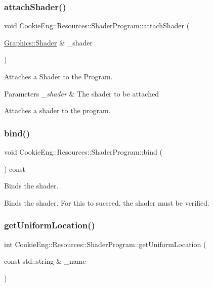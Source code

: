 \subsubsection{\texorpdfstring{attach\+Shader()}{attachShader()}}
{\footnotesize\ttfamily void Cookie\+Eng\+::\+Resources\+::\+Shader\+Program\+::attach\+Shader (\begin{DoxyParamCaption}\item[{\hyperlink{class_cookie_eng_1_1_graphics_1_1_shader}{Graphics\+::\+Shader} \&}]{\+\_\+shader }\end{DoxyParamCaption})}



Attaches a Shader to the Program. 


\begin{DoxyParams}{Parameters}
{\em \+\_\+shader} & The shader to be attached\\
\hline
\end{DoxyParams}
Attaches a shader to the program. \mbox{\label{class_cookie_eng_1_1_resources_1_1_shader_program_a4824333f2e0ee0e7cfc91cb0de92e065}} 
\subsubsection{\texorpdfstring{bind()}{bind()}}
{\footnotesize\ttfamily void Cookie\+Eng\+::\+Resources\+::\+Shader\+Program\+::bind (\begin{DoxyParamCaption}{ }\end{DoxyParamCaption}) const}



Binds the shader. 

Binds the shader. For this to sucseed, the shader must be verified. \mbox{\label{class_cookie_eng_1_1_resources_1_1_shader_program_ae2fb823b3e8da3cf7154e0a8ffe25c85}} 
\subsubsection{\texorpdfstring{get\+Uniform\+Location()}{getUniformLocation()}}
{\footnotesize\ttfamily int Cookie\+Eng\+::\+Resources\+::\+Shader\+Program\+::get\+Uniform\+Location (\begin{DoxyParamCaption}\item[{const std\+::string \&}]{\+\_\+name }\end{DoxyParamCaption})}



